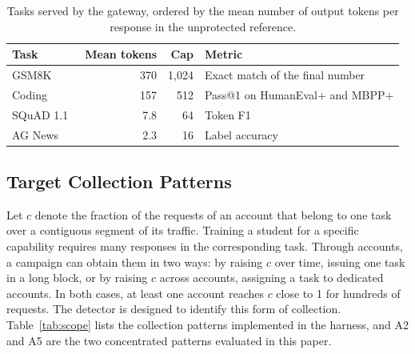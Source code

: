 \documentclass[conference]{IEEEtran}
\begin{document}
\begin{table}[!t]
\centering\footnotesize
\caption{Tasks served by the gateway, ordered by the mean number of output tokens per response in the unprotected reference.}
\label{tab:data}
\begin{tabularx}{\columnwidth}{@{}lrrY@{}}\toprule
Task & Mean tokens & Cap & Metric \\\midrule
GSM8K~\cite{cobbe2021gsm8k} & 370 & 1,024 & Exact match of the final number \\
Coding~\cite{ahmad2025opencodeinstruct,opencodeinstructdataset,liu2023evalplus,humanevalplusdataset,mbppplusdataset} & 157 & 512 & Pass@1 on HumanEval+ and MBPP+ \\
SQuAD 1.1~\cite{rajpurkar2016squad} & 7.8 & 64 & Token F1 \\
AG News~\cite{zhang2015char} & 2.3 & 16 & Label accuracy \\\bottomrule
\end{tabularx}
\end{table}

\subsection{Target Collection Patterns}
\label{sec:scope}
Let $c$ denote the fraction of the requests of an account that belong to one task over a contiguous segment of its traffic. Training a student for a specific capability requires many responses in the corresponding task. Through accounts, a campaign can obtain them in two ways: by raising $c$ over time, issuing one task in a long block, or by raising $c$ across accounts, assigning a task to dedicated accounts. In both cases, at least one account reaches $c$ close to 1 for hundreds of requests. The detector is designed to identify this form of collection. Table~\ref{tab:scope} lists the collection patterns implemented in the harness, and A2 and A5 are the two concentrated patterns evaluated in this paper.
\end{document}
